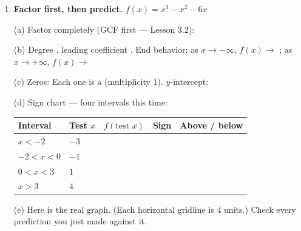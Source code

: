 \documentclass[10pt]{article}
\newcommand{\lgrid}[4]{%
  \draw[step=1, linegray!40, very thin] (#1,#3) grid (#2,#4);
  \draw[->, semithick, charcoal] (#1,0)--(#2,0) node[below right, font=\scriptsize]{$x$};
  \draw[->, semithick, charcoal] (0,#3)--(0,#4) node[left, font=\scriptsize]{$y$};}
\begin{document}
\begin{tcolorbox}[colback=white, colframe=black!40, title=\textbf{Tier A --- Approaching Proficiency},
    fonttitle=\bfseries, arc=1.5mm, left=3mm, right=3mm, top=2mm, bottom=2mm, breakable]
\begin{enumerate}[leftmargin=1.7em, itemsep=10pt]
  \item \textbf{Factor first, then predict.} $f(x) = x^3 - x^2 - 6x$

    \vspace{2pt}
    (a) Factor completely (GCF first --- Lesson 3.2): \blank{5.0cm}

    \vspace{2pt}
    (b) Degree \blank{0.8cm}, leading coefficient \blank{0.8cm}. End behavior: as $x\to-\infty$,
    $f(x)\to$ \blank{1.2cm}; as $x\to+\infty$, $f(x)\to$ \blank{1.2cm}

    \vspace{2pt}
    (c) Zeros: \blank{3.0cm} \quad Each one is a \blank{1.8cm} (multiplicity $1$).
    \quad $y$-intercept: \blank{1.4cm}

    \vspace{2pt}
    (d) Sign chart --- four intervals this time:

    \vspace{2pt}
    \renewcommand{\arraystretch}{1.5}
    \begin{tabularx}{\linewidth}{|C{2.4cm}|C{1.4cm}|C{3.0cm}|C{1.6cm}|X|}
    \hline
    \textbf{Interval} & \textbf{Test $x$} & \textbf{$f(\text{test }x)$} & \textbf{Sign} & \textbf{Above / below} \\ \hline
    $x<-2$    & $-3$ & & & \\ \hline
    $-2<x<0$  & $-1$ & & & \\ \hline
    $0<x<3$   & $1$  & & & \\ \hline
    $x>3$     & $4$  & & & \\ \hline
    \end{tabularx}

    \vspace{3pt}
    (e) Here is the real graph. (Each horizontal gridline is $4$ units.) Check every prediction you
    just made against it.
    \begin{center}
    \end{center}


\end{enumerate}
\end{tcolorbox}
\end{document}
